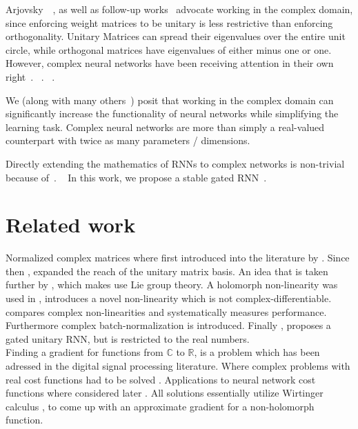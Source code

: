 \documentclass{article}
\begin{document}
Arjovsky~\etal~\cite{Arjovsky}, as well as follow-up works~\cite{Hyland, Wisdom} advocate working in the complex domain, since enforcing weight matrices to be unitary is less restrictive than enforcing orthogonality. Unitary Matrices can spread their eigenvalues over the entire unit circle, while orthogonal matrices have eigenvalues of either minus one or one.  However, complex neural networks have been receiving attention in their own right~. ~. ~.  

We (along with many others~) posit that working in the complex domain can significantly increase the functionality of neural networks while simplifying the learning task.  Complex neural networks are more than simply a real-valued counterpart with twice as many parameters / dimensions.

Directly extending the mathematics of RNNs to complex networks is non-trivial because of~. ~ In this work, we propose a stable gated RNN~.


\section{Related work}
Normalized complex matrices where first introduced into the literature by \cite{Arjovsky}. Since then \cite{Wisdom}, expanded the reach of the unitary matrix basis. An idea that is taken further by \cite{Hyland}, which makes use Lie group theory.  
A holomorph non-linearity was used in \cite{Guberman}, \cite{Arjovsky} introduces a novel non-linearity which is not complex-differentiable. \cite{Trabelsi} compares complex non-linearities and systematically measures performance. Furthermore complex batch-normalization is introduced.
Finally \cite{Jing}, proposes a gated unitary RNN, but is restricted to the real numbers. \\
Finding a gradient for functions from $\mathbb{C}$ to $\mathbb{R}$, is a problem which has been adressed in the digital signal processing literature. Where complex problems with real cost functions had to be solved \cite{Brandwood}\cite{Bos}\cite{Franken}\cite{Delgado}. Applications to neural network cost functions where considered later \cite{Mandic}. All solutions essentially utilize Wirtinger calculus \cite{Wirtinger}, to come up with an approximate gradient for a non-holomorph function.
\end{document}
